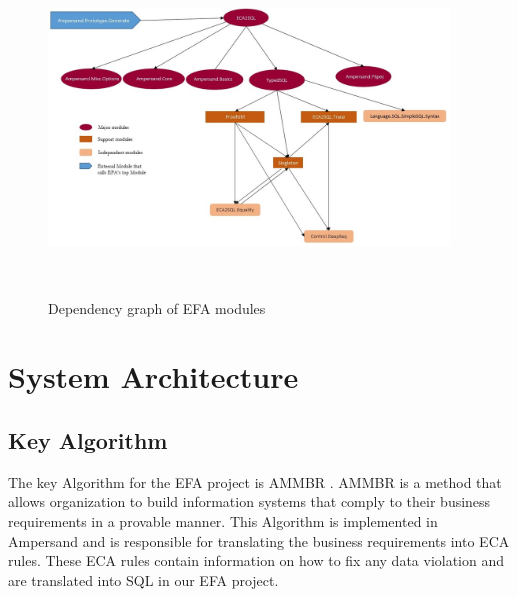 \documentclass[12pt]{article}
\begin{document}
\begin{figure}
    \centering
    \includegraphics[width=0.95\textwidth]{../DesignDoc/depent_tree}
    \caption{Dependency graph of EFA modules}~\label{fig:figure1}
\end{figure}

\newpage
\section{System Architecture} \label{SystemArch}

\subsection{Key Algorithm}
The key Algorithm for the EFA project is AMMBR \cite{AMMBR}. AMMBR is a method that allows organization to build information systems that comply to their business requirements in a provable manner. This Algorithm is implemented in Ampersand and is responsible for translating the business requirements into ECA rules. These ECA rules contain information on how to fix any data violation and are translated into SQL in our EFA project.
\end{document}
